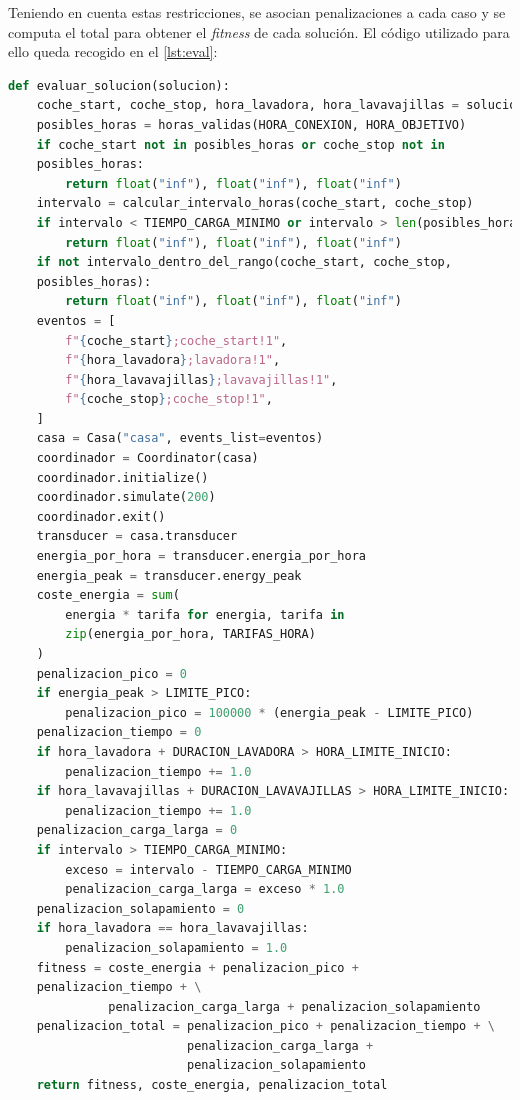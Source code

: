 \documentclass[11pt,a4paper]{book}
\begin{document}
Teniendo en cuenta estas restricciones, se asocian penalizaciones a cada caso y se computa el total para obtener el \textit{fitness} de cada solución. El código utilizado para ello queda recogido en el \autoref{lst:eval}:
\begin{lstlisting}[language=Python, caption={Función \texttt{evaluar\_solucion}}, label={lst:eval}]
def evaluar_solucion(solucion):
    coche_start, coche_stop, hora_lavadora, hora_lavavajillas = solucion
    posibles_horas = horas_validas(HORA_CONEXION, HORA_OBJETIVO)
    if coche_start not in posibles_horas or coche_stop not in 
    posibles_horas:
        return float("inf"), float("inf"), float("inf")
    intervalo = calcular_intervalo_horas(coche_start, coche_stop)
    if intervalo < TIEMPO_CARGA_MINIMO or intervalo > len(posibles_horas):
        return float("inf"), float("inf"), float("inf")
    if not intervalo_dentro_del_rango(coche_start, coche_stop, 
    posibles_horas):
        return float("inf"), float("inf"), float("inf")
    eventos = [
        f"{coche_start};coche_start!1",
        f"{hora_lavadora};lavadora!1",
        f"{hora_lavavajillas};lavavajillas!1",
        f"{coche_stop};coche_stop!1",
    ]
    casa = Casa("casa", events_list=eventos)
    coordinador = Coordinator(casa)
    coordinador.initialize()
    coordinador.simulate(200)
    coordinador.exit()
    transducer = casa.transducer
    energia_por_hora = transducer.energia_por_hora
    energia_peak = transducer.energy_peak
    coste_energia = sum(
        energia * tarifa for energia, tarifa in 
        zip(energia_por_hora, TARIFAS_HORA)
    )
    penalizacion_pico = 0
    if energia_peak > LIMITE_PICO:
        penalizacion_pico = 100000 * (energia_peak - LIMITE_PICO)
    penalizacion_tiempo = 0
    if hora_lavadora + DURACION_LAVADORA > HORA_LIMITE_INICIO:
        penalizacion_tiempo += 1.0
    if hora_lavavajillas + DURACION_LAVAVAJILLAS > HORA_LIMITE_INICIO:
        penalizacion_tiempo += 1.0
    penalizacion_carga_larga = 0
    if intervalo > TIEMPO_CARGA_MINIMO:
        exceso = intervalo - TIEMPO_CARGA_MINIMO
        penalizacion_carga_larga = exceso * 1.0  
    penalizacion_solapamiento = 0
    if hora_lavadora == hora_lavavajillas:
        penalizacion_solapamiento = 1.0
    fitness = coste_energia + penalizacion_pico + 
    penalizacion_tiempo + \
              penalizacion_carga_larga + penalizacion_solapamiento
    penalizacion_total = penalizacion_pico + penalizacion_tiempo + \
                         penalizacion_carga_larga + 
                         penalizacion_solapamiento
    return fitness, coste_energia, penalizacion_total
\end{lstlisting}
\end{document}
